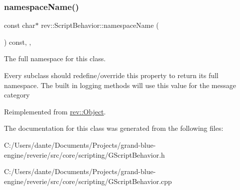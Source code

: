 \mbox{\label{classrev_1_1_script_behavior_a5296bd41ce1593182019f8be6628eada}} 
\subsubsection{\texorpdfstring{namespaceName()}{namespaceName()}}
{\footnotesize\ttfamily const char$\ast$ rev\+::\+Script\+Behavior\+::namespace\+Name (\begin{DoxyParamCaption}{ }\end{DoxyParamCaption}) const\hspace{0.3cm}{\ttfamily [inline]}, {\ttfamily [override]}, {\ttfamily [virtual]}}



The full namespace for this class. 

Every subclass should redefine/override this property to return its full namespace. The built in logging methods will use this value for the message category 

Reimplemented from \mbox{\hyperlink{classrev_1_1_object_aaeb638d3e10f361c56c211a318a27f3d}{rev\+::\+Object}}.



The documentation for this class was generated from the following files\+:\begin{DoxyCompactItemize}
\item 
C\+:/\+Users/dante/\+Documents/\+Projects/grand-\/blue-\/engine/reverie/src/core/scripting/G\+Script\+Behavior.\+h\item 
C\+:/\+Users/dante/\+Documents/\+Projects/grand-\/blue-\/engine/reverie/src/core/scripting/G\+Script\+Behavior.\+cpp\end{DoxyCompactItemize}
